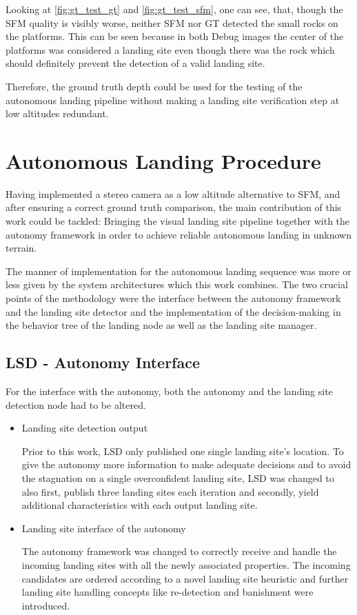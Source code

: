 Looking at \cref{fig:gt_test_gt} and \cref{fig:gt_test_sfm}, one can see, that, though the SFM quality is visibly worse, neither SFM nor GT detected the small rocks on the platforms. This can be seen because in both Debug images the center of the platforms was considered a landing site even though there was the rock which should definitely prevent the detection of a valid landing site.

Therefore, the ground truth depth could be used for the testing of the autonomous landing pipeline without making a landing site verification step at low altitudes redundant.

\clearpage %
\section{Autonomous Landing Procedure}

Having implemented a stereo camera as a low altitude alternative to SFM, and after ensuring a correct ground truth comparison, the main contribution of this work could be tackled: Bringing the visual landing site pipeline together with the autonomy framework in order to achieve reliable autonomous landing in unknown terrain.

The manner of implementation for the autonomous landing sequence was more or less given by the system architectures which this work combines. The two crucial points of the methodology were the interface between the autonomy framework and the landing site detector and the implementation of the decision-making in the behavior tree of the landing node as well as the landing site manager.

\subsection{LSD - Autonomy Interface}

For the interface with the autonomy, both the autonomy and the landing site detection node had to be altered.

\begin{itemize}
    \item Landing site detection output

    Prior to this work, LSD only published one single landing site's location. To give the autonomy more information to make adequate decisions and to avoid the stagnation on a single overconfident landing site, LSD was changed to also first, publish three landing sites each iteration and secondly, yield additional characteristics with each output landing site.
    \item Landing site interface of the autonomy

    The autonomy framework was changed to correctly receive and handle the incoming landing sites with all the newly associated properties. The incoming candidates are ordered according to a novel landing site heuristic and further landing site handling concepts like re-detection and banishment were introduced.    
\end{itemize}

